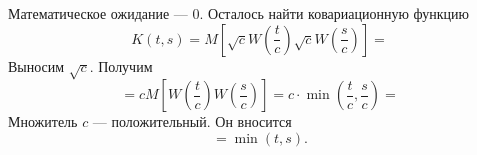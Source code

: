 \begin{enumerate}[label=\alph*)]
  Математическое ожидание --- 0.
  Осталось найти ковариационную функцию
  $$K \left( t, s \right) =
    M \left[ \sqrt{c} W \left( \frac{t}{c} \right) \sqrt{c} W \left( \frac{s}{c} \right) \right] =$$
  Выносим $ \sqrt{c}$.
  Получим
  $$= cM \left[ W \left( \frac{t}{c} \right) W \left( \frac{s}{c} \right) \right] =
  c \cdot \min \left( \frac{t}{c}, \frac{s}{c} \right) =$$
  Множитель $c$ --- положительный.
  Он вносится
  $$= \min \left( t, s \right).$$
\end{enumerate}
